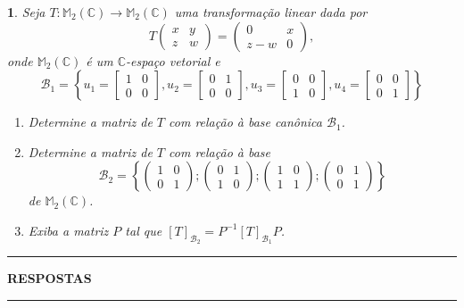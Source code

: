 \documentclass[12pt]{exam}
\newtheorem{exercicio}{}
\newcommand{\complex}{\mathbb{C}}
\newcommand{\cp}[1]{\mathbb{#1}}
\begin{document}
\begin{exercicio}
  Seja $T : \cp{M}_2(\complex) \to \cp{M}_2(\complex)$ uma transforma\c{c}\~ao linear dada por
  \[
    T \begin{pmatrix}
      x & y\\
      z & w
    \end{pmatrix} = \begin{pmatrix}
      0 & x\\
      z - w & 0
    \end{pmatrix},
  \]
  onde $\cp{M}_2(\complex)$ \'e um $\complex$-espa\c{c}o vetorial
  e
  \[
      \mathcal{B}_1 = \left\{u_1 = \begin{bmatrix}
        1 & 0\\0 & 0
      \end{bmatrix}, u_2 = \begin{bmatrix}
        0 & 1\\0 & 0
      \end{bmatrix}, u_3 = \begin{bmatrix}
        0 & 0\\1 & 0
      \end{bmatrix}, u_4 = \begin{bmatrix}
        0 & 0\\0 & 1
      \end{bmatrix}\right\}
  \]
    \begin{enumerate}[label=({\alph*})]
      \item Determine a matriz de $T$ com rela\c{c}\~ao \`a base can\^onica $\mathcal{B}_1$.
      \item Determine a matriz de $T$ com rela\c{c}\~ao \`a base
      \[
        \mathcal{B}_2 = \left\{\begin{pmatrix}
          1 & 0\\
          0 & 1
        \end{pmatrix}; \begin{pmatrix}
          0 & 1\\
          1 & 0
        \end{pmatrix}; \begin{pmatrix}
          1 & 0\\
          1 & 1
        \end{pmatrix}; \begin{pmatrix}
          0 & 1\\
          0 & 1
        \end{pmatrix}\right\}
      \]
      de $\cp{M}_2(\complex)$.
      \item Exiba a matriz $P$ tal que $[T]_{\mathcal{B}_2} = P^{-1}[T]_{\mathcal{B}_1}P$.
    \end{enumerate}
\end{exercicio}

\newpage
{}
\hrule
\begin{center}
{\large\bf RESPOSTAS}
\end{center}
\hrule

\end{document}
